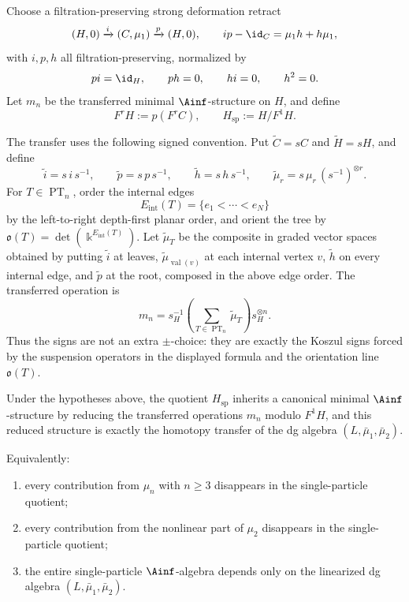 Choose a filtration-preserving strong deformation retract
\[
(H,0)\xrightarrow{i}(C,\mu_1)\xrightarrow{p}(H,0),
\qquad
ip-\id_C=\mu_1 h+h\mu_1,
\]
with $i,p,h$ all filtration-preserving, normalized by
\[
p i=\id_H,\qquad p h=0,\qquad h i=0,\qquad h^2=0.
\]
Let $m_n$ be the transferred minimal $\Ainf$-structure on $H$, and define
\[
F^rH:=p(F^rC),
\qquad
H_{\mathrm{sp}}:=H/F^1H.
\]

The transfer uses the following signed convention. Put
\(\widetilde C=sC\) and \(\widetilde H=sH\), and define
\[
\widetilde i=s\,i\,s^{-1},\qquad
\widetilde p=s\,p\,s^{-1},\qquad
\widetilde h=s\,h\,s^{-1},\qquad
\widetilde\mu_r=s\,\mu_r\,(s^{-1})^{\otimes r}.
\]
For \(T\in\operatorname{PT}_n\), order the internal edges
\[
E_{\mathrm{int}}(T)=\{e_1<\cdots<e_N\}
\]
by the left-to-right depth-first planar order, and orient the tree by
\(\mathfrak o(T)=\det(\Bbbk^{E_{\mathrm{int}}(T)})\). Let
\(\widetilde\mu_T\) be the composite in graded vector spaces obtained
by putting \(\widetilde i\) at leaves, \(\widetilde\mu_{\operatorname{val}(v)}\)
at each internal vertex \(v\), \(\widetilde h\) on every internal
edge, and \(\widetilde p\) at the root, composed in the above edge
order. The transferred operation is
\begin{equation}\label{eq:cbt-suspended-transfer-split}
 m_n
 =
 s_H^{-1}
 \left(\sum_{T\in\operatorname{PT}_n}\widetilde\mu_T\right)
 s_H^{\otimes n}.
\end{equation}
Thus the signs are not an extra \(\pm\)-choice: they are exactly the
Koszul signs forced by the suspension operators in the displayed
formula and the orientation line \(\mathfrak o(T)\).

\begin{theorem}
Under the hypotheses above, the quotient $H_{\mathrm{sp}}$ inherits a canonical minimal $\Ainf$-structure by reducing the transferred operations $m_n$ modulo $F^1H$, and this reduced structure is exactly the homotopy transfer of the dg algebra $(L,\bar\mu_1,\bar\mu_2)$.

Equivalently:
\begin{enumerate}[label=\textup{(\alph*)},leftmargin=2em]
\item every contribution from $\mu_n$ with $n\ge 3$ disappears in the single-particle quotient;
\item every contribution from the nonlinear part of $\mu_2$ disappears in the single-particle quotient;
\item the entire single-particle $\Ainf$-algebra depends only on the linearized dg algebra $(L,\bar\mu_1,\bar\mu_2)$.
\end{enumerate}
\end{theorem}


